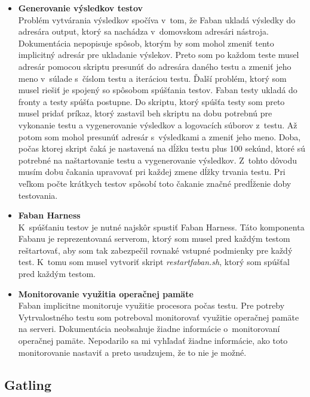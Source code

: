 \documentclass[12pt,oneside,final]{fithesis-utf8}
\newcommand\underscore[1]{\underline{\hspace{8pt}}}
\begin{document}
\begin{itemize}

\item \textbf{Generovanie výsledkov testov}\\
Problém vytvárania výsledkov spočíva v~tom, že Faban ukladá výsledky do adresára output, ktorý sa nachádza v~domovskom adresári nástroja. Dokumentácia nepopisuje spôsob, ktorým by som mohol zmeniť tento implicitný adresár pre ukladanie výslekov. Preto som po každom teste musel adresár pomocou skriptu presunúť do adresára daného testu a zmeniť jeho meno v~súlade s~číslom testu a iteráciou testu. Ďalší problém, ktorý som musel riešiť je spojený so spôsobom spúšťania testov. Faban testy ukladá do fronty a testy spúšťa postupne. Do skriptu, ktorý spúšťa testy som preto musel pridať príkaz, ktorý zastavil beh skriptu na dobu potrebnú pre vykonanie testu a vygenerovanie výsledkov a logovacích súborov z~testu. Až potom som mohol presunúť adresár s~výsledkami a zmeniť jeho meno. Doba, počas ktorej skript čaká je nastavená na dĺžku testu plus 100 sekúnd, ktoré sú potrebné na naštartovanie testu a vygenerovanie výsledkov. Z~tohto dôvodu musím dobu čakania upravovať pri každej zmene dĺžky trvania testu. Pri veľkom počte krátkych testov spôsobí toto čakanie značné predĺženie doby testovania.

\item \textbf{Faban Harness}\\
K~spúšťaniu testov je nutné najskôr spustiť Faban Harness. Táto komponenta Fabanu je reprezentovaná serverom, ktorý som musel pred každým testom reštartovať, aby som tak zabezpečil rovnaké vstupné podmienky pre každý test. K~tomu som musel vytvoriť skript \textit{restart\underscore{}faban.sh}, ktorý som spúšťal pred každým testom.\\

\hypertarget{faban_memory}{}
\item \textbf{Monitorovanie využitia operačnej pamäte}\\
Faban implicitne monitoruje využitie procesora počas testu. Pre potreby Vytrvalostného testu som potreboval monitorovať využitie operačnej pamäte na serveri. Dokumentácia neobsahuje žiadne informácie o~monitorovaní operačnej pamäte. Nepodarilo sa mi vyhľadať žiadne informácie, ako toto monitorovanie nastaviť a preto usudzujem, že to nie je možné.\\

\end{itemize}

\subsection{Gatling}
\end{document}
